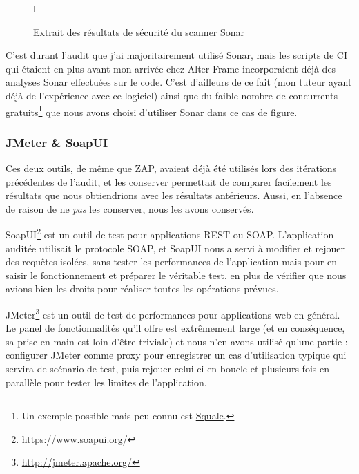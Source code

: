 \begin{figure}{l}
	\caption{Extrait des résultats de sécurité du scanner Sonar}
	\label{fig:sonar_sec}
\end{figure}

C'est durant l'audit que j'ai majoritairement utilisé Sonar, mais les scripts de CI qui étaient en plus avant mon arrivée chez Alter Frame incorporaient déjà des analyses Sonar effectuées sur le code. C'est d'ailleurs de ce fait (mon tuteur ayant déjà de l'expérience avec ce logiciel) ainsi que du faible nombre de concurrents gratuits\footnote{Un exemple possible mais peu connu est \href{http://www.squale.org/}{Squale}.} que nous avons choisi d'utiliser Sonar dans ce cas de figure.

\subsubsection{JMeter \& SoapUI}
Ces deux outils, de même que ZAP, avaient déjà été utilisés lors des itérations précédentes de l'audit, et les conserver permettait de comparer facilement les résultats que nous obtiendrions avec les résultats antérieurs. Aussi, en l'absence de raison de ne \emph{pas} les conserver, nous les avons conservés. 

SoapUI\footnote{\url{https://www.soapui.org/}} est un outil de test pour applications REST ou SOAP. L'application auditée utilisait le protocole SOAP, et SoapUI nous a servi à modifier et rejouer des requêtes isolées, sans tester les performances de l'application mais pour en saisir le fonctionnement et préparer le véritable test, en plus de vérifier que nous avions bien les droits pour réaliser toutes les opérations prévues. 

JMeter\footnote{\url{http://jmeter.apache.org/}} est un outil de test de performances pour applications web en général. Le panel de fonctionnalités qu'il offre est extrêmement large (et en conséquence, sa prise en main est loin d'être triviale) et nous n'en avons utilisé qu'une partie : configurer JMeter comme proxy pour enregistrer un cas d'utilisation typique qui servira de scénario de test, puis rejouer celui-ci en boucle et plusieurs fois en parallèle pour tester les limites de l'application. 

